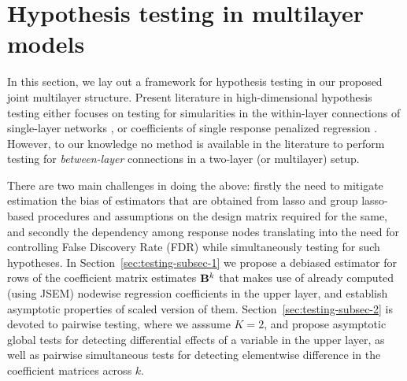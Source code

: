 \section{Hypothesis testing in multilayer models}
\label{sec:sec3}
In this section, we lay out a framework for hypothesis testing in our proposed joint multilayer structure. Present literature in high-dimensional hypothesis testing either focuses on testing for simularities in the within-layer connections of single-layer networks \citep{CaiLiu16,Liu17}, or coefficients of single response penalized regression \citep{vanDeGeerEtal14,ZhangZhang14,MitraZhang16}. However, to our knowledge no method is available in the literature to perform testing for {\it between-layer} connections in a two-layer (or multilayer) setup.

There are two main challenges in doing the above: firstly the need to mitigate estimation the bias of estimators that are obtained from lasso and group lasso-based procedures and assumptions on the design matrix required for the same, and secondly the dependency among response nodes translating into the need for controlling False Discovery Rate (FDR) while simultaneously testing for such hypotheses. In Section~\ref{sec:testing-subsec-1} we propose a debiased estimator for rows of the coefficient matrix estimates ${\mathbf{B}}^k$ that makes use of already computed (using JSEM) nodewise regression coefficients in the upper layer, and establish asymptotic properties of scaled version of them. Section~\ref{sec:testing-subsec-2} is devoted to pairwise testing, where we asssume $K=2$, and propose asymptotic global tests for detecting differential effects of a variable in the upper layer, as well as pairwise simultaneous tests for detecting elementwise difference in the coefficient matrices across $k$.


